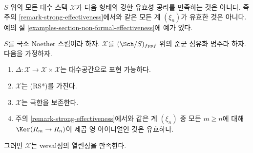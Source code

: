 \noindent
$S$ 위의 모든 대수 스택 $\mathcal{X}$가 다음 형태의 강한 유효성 공리를
만족하는 것은 아니다. 즉 주의 \ref{remark-strong-effectiveness}에서와
같은 모든 계 $(\xi_n)$가 유효한 것은 아니다.
예의 절 \ref{examples-section-non-formal-effectiveness}에 예가 있다.

\begin{lemma}
\label{lemma-SGE-implies-openness-versality}
$S$를 국소 Noether 스킴이라 하자. $\mathcal{X}$를
$(\Sch/S)_{fppf}$ 위의 준군 섬유화 범주라 하자. 다음을 가정하자.
\begin{enumerate}
\item $\Delta : \mathcal{X} \to \mathcal{X} \times \mathcal{X}$는
대수공간으로 표현 가능하다.
\item $\mathcal{X}$는 (RS*)를 가진다.
\item $\mathcal{X}$는 극한을 보존한다.
\item 주의 \ref{remark-strong-effectiveness}에서와 같은 계 $(\xi_n)$ 중
모든 $m \geq n$에 대해 $\Ker(R_m \to R_n)$이 제곱 영 아이디얼인 것은
유효하다.
\end{enumerate}
그러면 $\mathcal{X}$는 versal성의 열린성을 만족한다.
\end{lemma}

